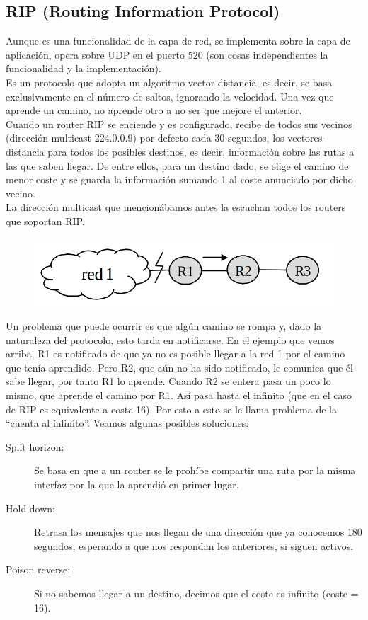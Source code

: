 \subsection{RIP (Routing Information Protocol)}

Aunque es una funcionalidad de la capa de red, se implementa sobre la capa de aplicación, opera sobre UDP en el puerto 520 (son cosas independientes la funcionalidad y la implementación). \\

Es un protocolo que adopta un algoritmo vector-distancia, es decir, se basa exclusivamente en el número de saltos, ignorando la velocidad. Una vez que aprende un camino, no aprende otro a no ser que mejore el anterior.\\

Cuando un router RIP se enciende y es configurado, recibe de todos sus vecinos (dirección multicast 224.0.0.9) por defecto cada 30 segundos, los vectores-distancia para todos los posibles destinos, es decir, información sobre las rutas a las que saben llegar. De entre ellos, para un destino dado, se elige el camino de menor coste y se guarda la información sumando 1 al coste anunciado por dicho vecino. \\

La dirección multicast que mencionábamos antes la escuchan todos los routers que soportan RIP.\\ 

\begin{figure}[H]
    \centering
    \includegraphics[width=0.6\linewidth]{./images/cuenta-infinito-rip.png}
    \label{fig:rip}
\end{figure}

Un problema que puede ocurrir es que algún camino se rompa y, dado la naturaleza del protocolo, esto tarda en notificarse. En el ejemplo que vemos arriba, R1 es notificado de que ya no es posible llegar a la red 1 por el camino que tenía aprendido. Pero R2, que aún no ha sido notificado, le comunica que él sabe llegar, por tanto R1 lo aprende. Cuando R2 se entera pasa un poco lo mismo, que aprende el camino por R1. Así pasa hasta el infinito (que en el caso de RIP es equivalente a coste 16). Por esto a esto se le llama problema de la ``cuenta al infinito''. Veamos algunas posibles soluciones:
\begin{description}
    \item [Split horizon:] Se basa en que a un router se le prohíbe compartir una ruta por la misma interfaz por la que la aprendió en primer lugar.
    \item [Hold down:] Retrasa los mensajes que nos llegan de una dirección que ya conocemos 180 segundos, esperando a que nos respondan los anteriores, si siguen activos. 
    \item [Poison reverse:] Si no sabemos llegar a un destino, decimos que el coste es infinito (coste = 16).
\end{description}

